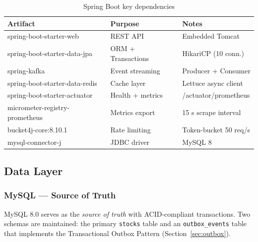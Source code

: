 \documentclass[12pt,a4paper,twoside]{article}
\begin{document}
\begin{table}[H]
\centering
\caption{Spring Boot key dependencies}
\label{tab:deps}
\begin{tabularx}{\textwidth}{@{}llX@{}}
\toprule
\textbf{Artifact}                         & \textbf{Purpose}              & \textbf{Notes} \\
\midrule
spring-boot-starter-web                   & REST API                      & Embedded Tomcat \\
spring-boot-starter-data-jpa              & ORM + Transactions            & HikariCP (10 conn.) \\
spring-kafka                              & Event streaming               & Producer + Consumer \\
spring-boot-starter-data-redis            & Cache layer                   & Lettuce async client \\
spring-boot-starter-actuator              & Health + metrics              & /actuator/prometheus \\
micrometer-registry-prometheus            & Metrics export                & 15 s scrape interval \\
bucket4j-core:8.10.1                      & Rate limiting                 & Token-bucket 50 req/s \\
mysql-connector-j                         & JDBC driver                   & MySQL 8 \\
\bottomrule
\end{tabularx}
\end{table}

\subsection{Data Layer}

\subsubsection{MySQL — Source of Truth}

MySQL 8.0 serves as the \emph{source of truth} with ACID-compliant
transactions.
Two schemas are maintained: the primary \texttt{stocks} table and an
\texttt{outbox\_events} table that implements the Transactional Outbox
Pattern (Section~\ref{sec:outbox}).
\end{document}
